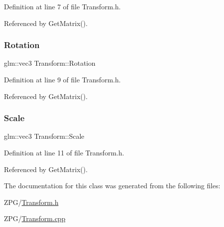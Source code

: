 Definition at line 7 of file Transform.\+h.



Referenced by Get\+Matrix().

\mbox{\label{classTransform_a0b39a3cad853ab427a91b761d82440d2}} 
\subsubsection{\texorpdfstring{Rotation}{Rotation}}
{\footnotesize\ttfamily glm\+::vec3 Transform\+::\+Rotation}



Definition at line 9 of file Transform.\+h.



Referenced by Get\+Matrix().

\mbox{\label{classTransform_a337690a3de8862de2f930e9ee1323365}} 
\subsubsection{\texorpdfstring{Scale}{Scale}}
{\footnotesize\ttfamily glm\+::vec3 Transform\+::\+Scale}



Definition at line 11 of file Transform.\+h.



Referenced by Get\+Matrix().



The documentation for this class was generated from the following files\+:\begin{DoxyCompactItemize}
\item 
Z\+P\+G/\mbox{\hyperlink{Transform_8h}{Transform.\+h}}\item 
Z\+P\+G/\mbox{\hyperlink{Transform_8cpp}{Transform.\+cpp}}\end{DoxyCompactItemize}
